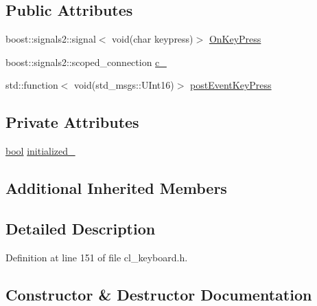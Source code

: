 \subsection*{Public Attributes}
\begin{DoxyCompactItemize}
\item 
boost\+::signals2\+::signal$<$ void(char keypress)$>$ \hyperlink{classsm__three__some_1_1keyboard__client_1_1ClKeyboard_a41d3a6e1a28673461ee5ce1dc531dcd3}{On\+Key\+Press}
\item 
boost\+::signals2\+::scoped\+\_\+connection \hyperlink{classsm__three__some_1_1keyboard__client_1_1ClKeyboard_aa55cfcdd60014aed37b8318224e47f9d}{c\+\_\+}
\item 
std\+::function$<$ void(std\+\_\+msgs\+::\+U\+Int16)$>$ \hyperlink{classsm__three__some_1_1keyboard__client_1_1ClKeyboard_a36efb98dcd78795abf90c9fb00a9f170}{post\+Event\+Key\+Press}
\end{DoxyCompactItemize}
\subsection*{Private Attributes}
\begin{DoxyCompactItemize}
\item 
\hyperlink{classbool}{bool} \hyperlink{classsm__three__some_1_1keyboard__client_1_1ClKeyboard_a27fc5aa7027eda6dddd0756448b48172}{initialized\+\_\+}
\end{DoxyCompactItemize}
\subsection*{Additional Inherited Members}


\subsection{Detailed Description}


Definition at line 151 of file cl\+\_\+keyboard.\+h.



\subsection{Constructor \& Destructor Documentation}
